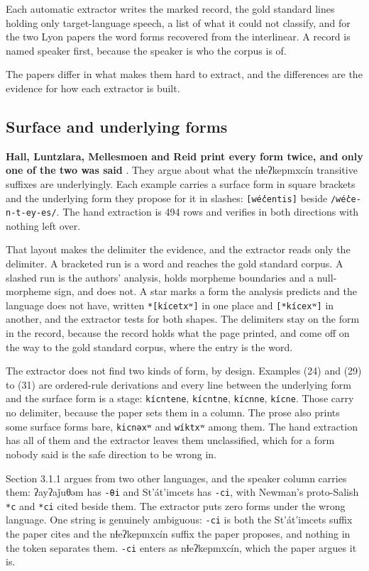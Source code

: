 Each automatic extractor writes the marked record, the gold standard lines holding only target-language speech, a list of what it could not classify, and for the two Lyon papers the word forms recovered from the interlinear. A record is named speaker first, because the speaker is who the corpus is of.

The papers differ in what makes them hard to extract, and the differences are the evidence for how each extractor is built.

\subsection{Surface and underlying forms}

\textbf{Hall, Luntzlara, Mellesmoen and Reid print every form twice, and only one of the two was said} \cite{src:Hall-Luntzlara-Mellesmoen-and-Reid-2026}. They argue about what the nɬeʔkepmxcín transitive suffixes are underlyingly. Each example carries a surface form in square brackets and the underlying form they propose for it in slashes: \texttt{[wéc̓entis]} beside \texttt{/wéc̓e-n-t-ey-es/}. The hand extraction is 494 rows and verifies in both directions with nothing left over.

That layout makes the delimiter the evidence, and the extractor reads only the delimiter. A bracketed run is a word and reaches the gold standard corpus. A slashed run is the authors' analysis, holds morpheme boundaries and a null-morpheme sign, and does not. A star marks a form the analysis predicts and the language does not have, written \texttt{*[kícetxʷ]} in one place and \texttt{[*kícexʷ]} in another, and the extractor tests for both shapes. The delimiters stay on the form in the record, because the record holds what the page printed, and come off on the way to the gold standard corpus, where the entry is the word.

The extractor does not find two kinds of form, by design. Examples (24) and (29) to (31) are ordered-rule derivations and every line between the underlying form and the surface form is a stage: \texttt{kícntene}, \texttt{kícntne}, \texttt{kícnne}, \texttt{kícne}. Those carry no delimiter, because the paper sets them in a column. The prose also prints some surface forms bare, \texttt{kicnəxʷ} and \texttt{wíktxʷ} among them. The hand extraction has all of them and the extractor leaves them unclassified, which for a form nobody said is the safe direction to be wrong in.

Section 3.1.1 argues from two other languages, and the speaker column carries them: ʔayʔaǰuθəm has \texttt{-θi} and St'át'imcets has \texttt{-ci}, with Newman's proto-Salish \texttt{*c} and \texttt{*ci} cited beside them. The extractor puts zero forms under the wrong language. One string is genuinely ambiguous: \texttt{-ci} is both the St'át'imcets suffix the paper cites and the nɬeʔkepmxcín suffix the paper proposes, and nothing in the token separates them. \texttt{-ci} enters as nɬeʔkepmxcín, which the paper argues it is.


